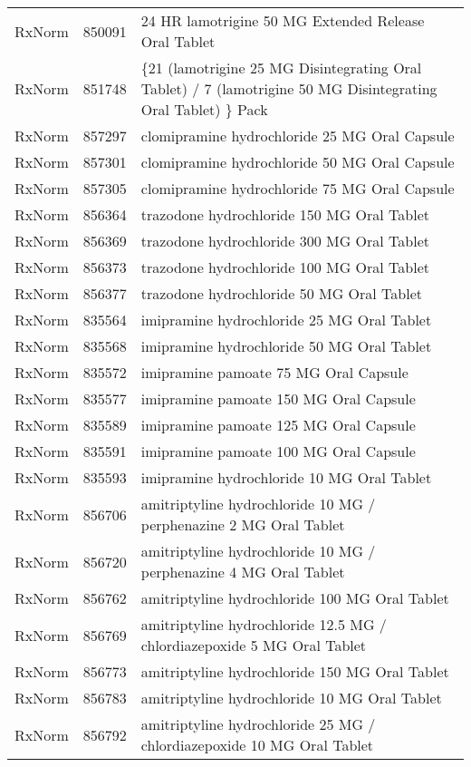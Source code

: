 \begin{longtable}{p{}p{}p{}}
  RxNorm & 850091 & 24 HR lamotrigine 50 MG Extended Release Oral Tablet \\ 
  RxNorm & 851748 & \{21 (lamotrigine 25 MG Disintegrating Oral Tablet) / 7 (lamotrigine 50 MG Disintegrating Oral Tablet) \} Pack \\ 
  RxNorm & 857297 & clomipramine hydrochloride 25 MG Oral Capsule \\ 
  RxNorm & 857301 & clomipramine hydrochloride 50 MG Oral Capsule \\ 
  RxNorm & 857305 & clomipramine hydrochloride 75 MG Oral Capsule \\ 
  RxNorm & 856364 & trazodone hydrochloride 150 MG Oral Tablet \\ 
  RxNorm & 856369 & trazodone hydrochloride 300 MG Oral Tablet \\ 
  RxNorm & 856373 & trazodone hydrochloride 100 MG Oral Tablet \\ 
  RxNorm & 856377 & trazodone hydrochloride 50 MG Oral Tablet \\ 
  RxNorm & 835564 & imipramine hydrochloride 25 MG Oral Tablet \\ 
  RxNorm & 835568 & imipramine hydrochloride 50 MG Oral Tablet \\ 
  RxNorm & 835572 & imipramine pamoate 75 MG Oral Capsule \\ 
  RxNorm & 835577 & imipramine pamoate 150 MG Oral Capsule \\ 
  RxNorm & 835589 & imipramine pamoate 125 MG Oral Capsule \\ 
  RxNorm & 835591 & imipramine pamoate 100 MG Oral Capsule \\ 
  RxNorm & 835593 & imipramine hydrochloride 10 MG Oral Tablet \\ 
  RxNorm & 856706 & amitriptyline hydrochloride 10 MG / perphenazine 2 MG Oral Tablet \\ 
  RxNorm & 856720 & amitriptyline hydrochloride 10 MG / perphenazine 4 MG Oral Tablet \\ 
  RxNorm & 856762 & amitriptyline hydrochloride 100 MG Oral Tablet \\ 
  RxNorm & 856769 & amitriptyline hydrochloride 12.5 MG / chlordiazepoxide 5 MG Oral Tablet \\ 
  RxNorm & 856773 & amitriptyline hydrochloride 150 MG Oral Tablet \\ 
  RxNorm & 856783 & amitriptyline hydrochloride 10 MG Oral Tablet \\ 
  RxNorm & 856792 & amitriptyline hydrochloride 25 MG / chlordiazepoxide 10 MG Oral Tablet \\ 

\end{longtable}
